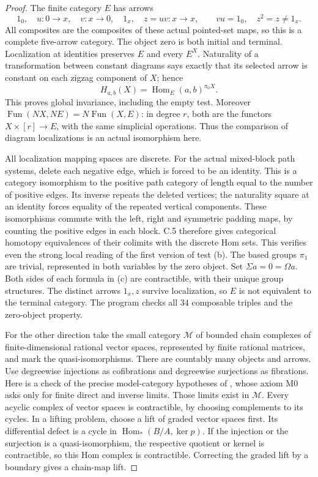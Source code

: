 \begin{proof}
The finite category $E$ has arrows
\[
 1_0,\quad u:0\to x,\quad v:x\to0,\quad1_x,
 \quad z=uv:x\to x,
 \qquad vu=1_0,\quad z^2=z\ne1_x.
\]
All composites are the composites of these actual pointed-set
maps, so this is a complete five-arrow category. The object zero
is both initial and terminal. Localization at identities preserves
$E$ and every $E^X$. Naturality of a transformation between
constant diagrams says exactly that its selected arrow is constant
on each zigzag component of $X$; hence
\[
 H_{a,b}(X)=\operatorname{Hom}_E(a,b)^{\pi_0X}.
\]
This proves global invariance, including the empty test. Moreover
$\operatorname{Fun}(NX,NE)=N\operatorname{Fun}(X,E)$: in
degree $r$, both are the functors $X\times[r]\to E$, with the
same simplicial operations. Thus the comparison of diagram
localizations is an actual isomorphism here.

All localization mapping spaces are discrete. For the actual
mixed-block path systems, delete each negative edge, which is
forced to be an identity. This is a category isomorphism to the
positive path category of length equal to the number of positive
edges. Its inverse repeats the deleted vertices; the naturality
square at an identity forces equality of the repeated vertical
components. These isomorphisms commute with the left, right and
symmetric padding maps, by counting the positive edges in each
block. C.5 therefore gives categorical homotopy equivalences of
their colimits with the discrete Hom sets. This verifies even the
strong local reading of the first version of test (b).
The based groups $\pi_1$ are trivial, represented in both variables
by the zero object. Set $\Sigma a=0=\Omega a$. Both sides of
each formula in (c) are contractible, with their unique group
structures. The distinct arrows $1_x,z$ survive localization,
so $E$ is not equivalent to the terminal category. The program
checks all $34$ composable triples and the zero-object property.

For the other direction take the small category $\mathcal M$ of
bounded chain complexes of finite-dimensional rational vector
spaces, represented by finite rational matrices, and mark the
quasi-isomorphisms. There are countably many objects and arrows.
Use degreewise injections as cofibrations and degreewise
surjections as fibrations. Here is a check of the precise
model-category hypotheses of \cite[\S1.4(iv)]{CpathsDKFunction},
whose axiom M0 asks only for finite direct and inverse limits.
Those limits exist in $\mathcal M$. Every acyclic complex of
vector spaces is contractible, by choosing complements to its
cycles. In a lifting problem, choose a lift of graded vector
spaces first. Its differential defect is a cycle in
$\operatorname{Hom}_*(B/A,\ker p)$. If the injection or the
surjection is a quasi-isomorphism, the respective quotient or
kernel is contractible, so this Hom complex is contractible.
Correcting the graded lift by a boundary gives a chain-map lift.


\end{proof}
